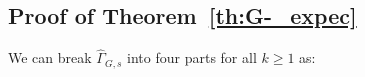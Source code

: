 \documentclass[11pt]{article}
\theoremstyle{remark}
\begin{document}



\subsection{Proof of Theorem~\ref{th:G-_expec}} 
\label{appendix:bias}


 
We can break $\hat{\Gamma}_{G,s}$ into four parts for all $k \geq 1$ as:
\end{document}
